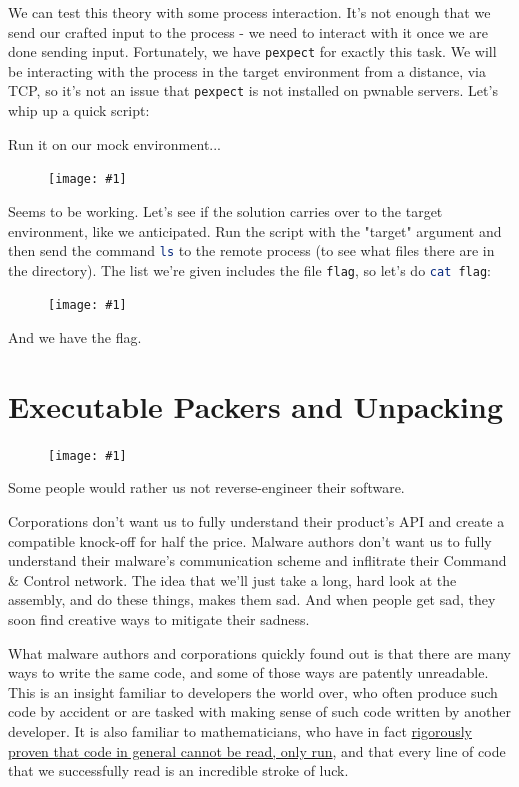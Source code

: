 \documentclass{article}
\newcommand{\displayimage}[1] {
\begin{figure}[H]
    \centering
    \texttt{[image: \#1]} 
\end{figure}
}
\newcommand{\wrapimageright}[1] {
    \begin{figure}
        \begin{center}
            \texttt{[image: \#1]} 
        \end{center}
    \end{figure}
}
\newcommand{\xcode}[2]{\colorbox{ubuntuback}{\lstinline[language=#1]|#2|}}
\begin{document}
        We can test this theory with some process interaction. It's not enough that we send our crafted input to the process - we need to interact with it once we are done sending input. Fortunately, we have \xcode{python}{pexpect} for exactly this task. We will be interacting with the process in the target environment from a distance, via TCP, so it's not an issue that \xcode{python}{pexpect} is not installed on pwnable servers. Let's whip up a quick script:



Run it on our mock environment...

\displayimage{../02_bof/local_test_2.png}

Seems to be working. Let's see if the solution carries over to the target environment, like we anticipated. Run the script with the "target" argument and then send the command \xcode{bash}{ls} to the remote process (to see what files there are in the directory). The list we're given includes the file \xcode{bash}{flag}, so let's do \xcode{bash}{cat flag}:

\displayimage{../02_bof/remote_test.png}

And we have the flag.

\section{Executable Packers and Unpacking}

\wrapimageright{./images/packed.jpg}
Some people would rather us not reverse-engineer their software. 

Corporations don't want us to fully understand their product's API and create a compatible knock-off for half the price. Malware authors don't want us to fully understand their malware's communication scheme and inflitrate their Command \& Control network. The idea that we'll just take a long, hard look at the assembly, and do these things, makes them sad. And when people get sad, they soon find creative ways to mitigate their sadness.

What malware authors and corporations quickly found out is that there are many ways to write the same code, and some of those ways are patently unreadable. This is an insight familiar to developers the world over, who often produce such code by accident or are tasked with making sense of such code written by another developer. It is also familiar to mathematicians, who have in fact \href{http://www.lel.ed.ac.uk/~gpullum/loopsnoop.html}{rigorously proven that code in general cannot be read, only run}, and that every line of code that we successfully read is an incredible stroke of luck. 
\end{document}
